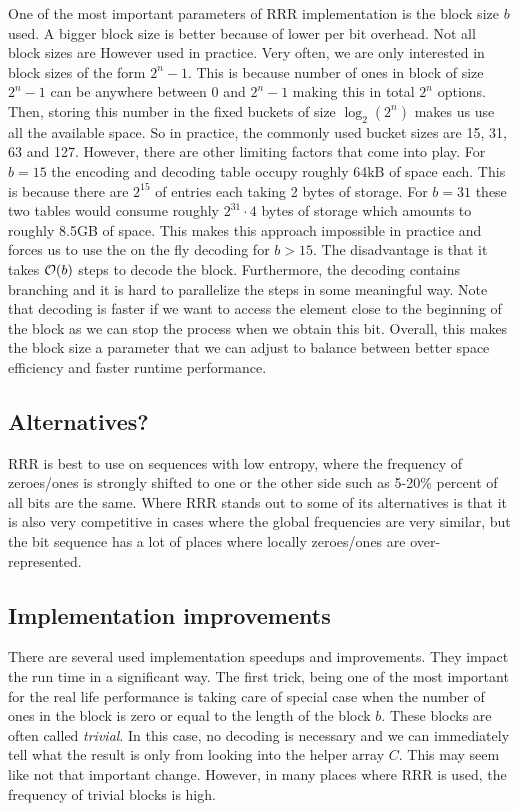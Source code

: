 One of the most important parameters of RRR implementation is the block
size $b$ used. A bigger block size is better because of lower per bit overhead. Not
all block sizes are However used in practice. Very often, we are only interested in
block sizes of the form $2^n-1$. This is because number of ones in block of size $2^n-1$
can be anywhere between $0$ and $2^n-1$ making this in total $2^n$ options. Then, storing
this number in the fixed buckets of size $\log_2(2^n)$ makes us use all the available space.
So in practice, the commonly used bucket sizes are 15, 31, 63 and 127. However, there are
other limiting factors that come into play. For $b=15$ the encoding and decoding table
occupy roughly 64kB of space each. This is because there are $2^{15}$ of entries each taking
2 bytes of storage. For $b=31$ these two tables would consume roughly $2^{31}\cdot 4$ bytes
of storage which amounts to roughly 8.5GB of space. This makes this approach impossible in
practice and forces us to use the on the fly decoding for $b>15$. The disadvantage
is that it takes $\mathcal{O}(b)$ steps to decode the block. Furthermore, the decoding
contains branching and it is hard to parallelize the steps in some meaningful way.
Note that decoding is faster if we want to access the element close to the beginning of
the block as we can stop the process when we obtain this bit. Overall, this makes the block
size a parameter that we can adjust to balance between better space efficiency and faster
runtime performance.


\subsection{Alternatives?}

RRR is best to use on sequences with low entropy, where the frequency of zeroes/ones is
strongly shifted to one or the other side such as 5-20\% percent of all bits are the same.
Where RRR stands out to some of its alternatives is that it is also very competitive in
cases where the global frequencies are very similar, but the bit sequence has a lot of places
where locally zeroes/ones are over-represented.

\subsection{Implementation improvements}

There are several used implementation speedups and improvements. They impact the run time in a
significant way. The first trick, being one of the most important for the real
life performance is taking care of special case when the number of ones in the block is zero
or equal to the length of the block $b$. These blocks are often called \textit{trivial}. In this
case, no decoding is necessary and we can immediately tell what the result is only from looking
into the helper array $C$. This may seem like not that important change. However, in many places
where RRR is used, the frequency of trivial blocks is high.
